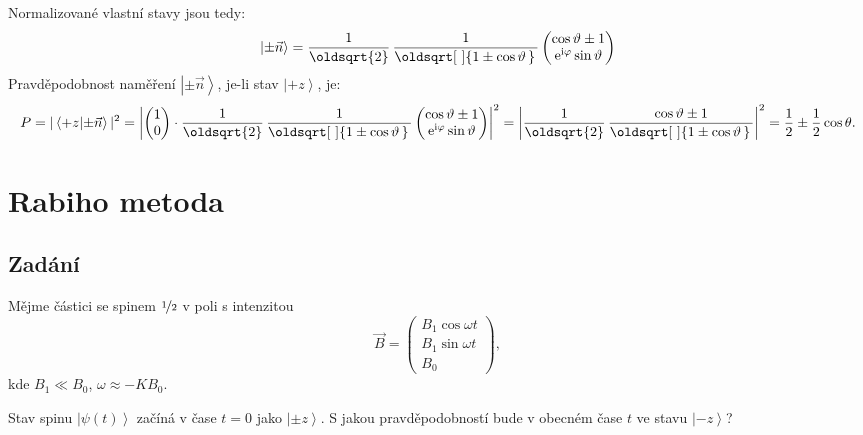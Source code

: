 \documentclass[10pt,a4paper]{article}
\renewcommand*{\sqrt}[2][\ ]{\oldsqrt[#1]{#2\,}\,}
\newcommand{\const}[1]{\text{#1}}
\newcommand{\mat}[1]{
    \begin{pmatrix}
        #1
    \end{pmatrix}
}
\newcommand{\ket}[1]{\left| #1 \right>}
\newcommand{\braket}[2]{\left< #1 \middle| #2 \right>}
\newcommand{\e}[1]{\const{e}^{#1}}
\renewcommand{\i}{\const{i}}
\begin{document}
Normalizované vlastní stavy jsou tedy:
\begin{equation*}
    \ket{\pm \vec n} =
    \frac{1}{\oldsqrt{2}} \,
    \frac{1}{\sqrt{1 \pm \cos \vartheta}}
    \mat{
        \cos \vartheta \pm 1 \\
        \e{\i \varphi} \sin \vartheta
    }
\end{equation*}
Pravděpodobnost naměření $\ket{\pm \vec n}$, je-li stav $\ket{+z}$, je:
\begin{equation*}
    P = | \braket{+z}{\pm \vec n} |^2
    =
    \left|
    \mat{1 \\ 0}
    \cdot
    \frac{1}{\oldsqrt{2}} \,
    \frac{1}{\sqrt{1 \pm \cos \vartheta}}
    \mat{
        \cos \vartheta \pm 1 \\
        \e{\i \varphi} \sin \vartheta
    }
    \right|^2
    =
    \left|
    \frac{1}{\oldsqrt{2}} \,
    \frac{\cos \vartheta \pm 1}{\sqrt{1 \pm \cos \vartheta}}
    \right|^2
    = \frac{1}{2} \pm \frac{1}{2} \cos \theta.
\end{equation*}


\section{Rabiho metoda}

\subsection{Zadání}
Mějme částici se spinem $\nicefrac{1}{2}$ v poli s intenzitou
\begin{equation*}
    \vec B = \mat{
        B_1 \cos \omega t \\
        B_1 \sin \omega t \\
        B_0
    },
\end{equation*}
kde $B_1 \ll B_0$, $\omega \approx -K B_0$.

Stav spinu $\ket{\psi(t)}$ začíná v čase $t=0$ jako $\ket{\pm z}$. S jakou pravděpodobností bude v obecném čase $t$ ve stavu $\ket{-z}$?
\end{document}
